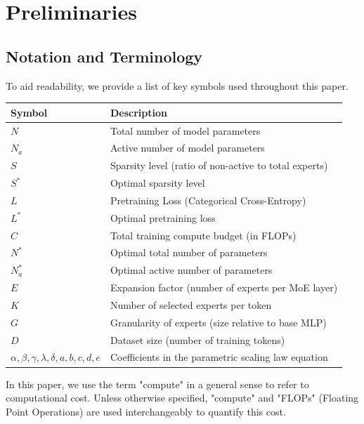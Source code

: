 \section{Preliminaries}
\label{app:prelim}


\subsection{Notation and Terminology}

\noindent To aid readability, we provide a list of key symbols used throughout this paper.

\begin{table}[ht]
\centering
\begin{tabular}{@{}ll@{}} %
\toprule
\textbf{Symbol} & \textbf{Description}                                             \\ \midrule
$N$               & Total number of model parameters                        \\
$N_a$             & Active number of model parameters                       \\
$S$               & Sparsity level (ratio of non-active to total experts)    \\
$S^*$             & Optimal sparsity level                                  \\
$L$               & Pretraining Loss (Categorical Cross-Entropy)           \\
$L^*$             & Optimal pretraining loss                                \\
$C$               & Total training compute budget (in FLOPs)               \\
$N^*$             & Optimal total number of parameters                       \\
$N^*_a$           & Optimal active number of parameters                      \\
$E$               & Expansion factor (number of experts per MoE layer)     \\
$K$               & Number of selected experts per token                    \\
$G$               & Granularity of experts (size relative to base MLP)       \\
$D$               & Dataset size (number of training tokens)               \\
$\alpha, \beta, \gamma, \lambda, \delta, a, b, c, d, e$ & Coefficients in the parametric scaling law equation \\ \bottomrule
\end{tabular}
\label{tab:symbols} %
\end{table}
 \noindent In this paper, we use the term "compute" in a general sense to refer to computational cost.
Unless otherwise specified, "compute" and "FLOPs" (Floating Point Operations) are used interchangeably to quantify this cost.



